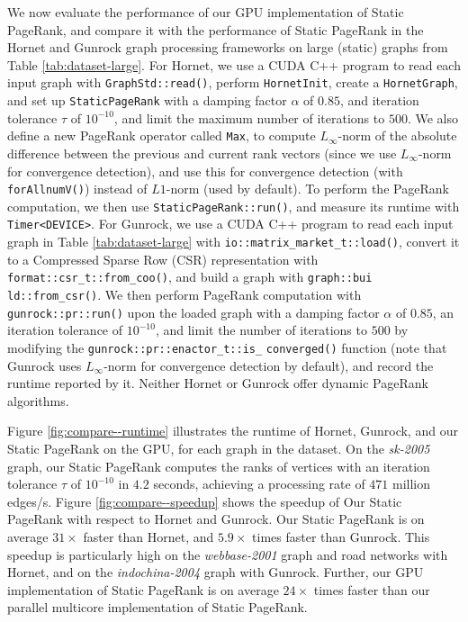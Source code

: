 We now evaluate the performance of our GPU implementation of Static PageRank, and compare it with the performance of Static PageRank in the Hornet \cite{busato2018hornet} and Gunrock \cite{wang2016gunrock} graph processing frameworks on large (static) graphs from Table \ref{tab:dataset-large}. For Hornet, we use a CUDA C++ program to read each input graph with \texttt{GraphStd::read()}, perform \texttt{HornetInit}, create a \texttt{HornetGraph}, and set up \texttt{StaticPageRank} with a damping factor $\alpha$ of $0.85$, and iteration tolerance $\tau$ of $10^{-10}$, and limit the maximum number of iterations to $500$. We also define a new PageRank operator called \texttt{Max}, to compute $L_\infty$-norm of the absolute difference between the previous and current rank vectors (since we use $L_\infty$-norm for convergence detection), and use this for convergence detection (with \texttt{forAllnumV()}) instead of $L1$-norm (used by default). To perform the PageRank computation, we then use \texttt{StaticPageRank::run()}, and measure its runtime with \texttt{Timer<DEVICE>}. For Gunrock, we use a CUDA C++ program to read each input graph in Table \ref{tab:dataset-large} with \texttt{io::matrix\_market\_t::load()}, convert it to a Compressed Sparse Row (CSR) representation with \texttt{format::csr\_t::from\_coo()}, and build a graph with \texttt{graph::bui} \texttt{ld::from\_csr()}. We then perform PageRank computation with \texttt{gunrock::pr::run()} upon the loaded graph with a damping factor $\alpha$ of $0.85$, an iteration tolerance of $10^{-10}$, and limit the number of iterations to $500$ by modifying the \texttt{gunrock::pr::enactor\_t::is\_} \texttt{converged()} function (note that Gunrock uses $L_\infty$-norm for convergence detection by default), and record the runtime reported by it. Neither Hornet or Gunrock offer dynamic PageRank algorithms.

Figure \ref{fig:compare--runtime} illustrates the runtime of Hornet, Gunrock, and our Static PageRank on the GPU, for each graph in the dataset. On the \textit{sk-2005} graph, our Static PageRank computes the ranks of vertices with an iteration tolerance $\tau$ of $10^{-10}$ in $4.2$ seconds, achieving a processing rate of $471$ million edges/s. Figure \ref{fig:compare--speedup} shows the speedup of Our Static PageRank with respect to Hornet and Gunrock. Our Static PageRank is on average $31\times$ faster than Hornet, and $5.9\times$ times faster than Gunrock. This speedup is particularly high on the \textit{webbase-2001} graph and road networks with Hornet, and on the \textit{indochina-2004} graph with Gunrock. Further, our GPU implementation of Static PageRank is on average $24\times$ times faster than our parallel multicore implementation of Static PageRank.

